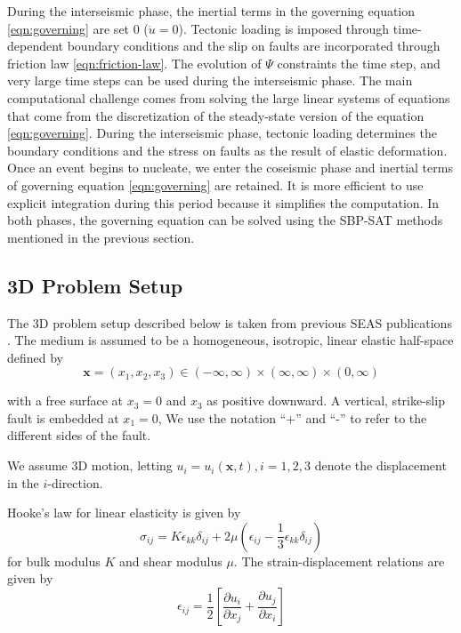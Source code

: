 During the interseismic phase, the inertial terms in the governing equation \ref{eqn:governing} are set 0 ($\ddot{u} = 0$).
Tectonic loading is imposed through time-dependent boundary conditions and the slip on faults are incorporated through friction law \ref{eqn:friction-law}.
The evolution of $\Psi$ constraints the time step, and very large time steps can be used during the interseismic phase.
The main computational challenge comes from solving the large linear systems of equations that come from the discretization of the steady-state version of the equation \ref{eqn:governing}.
During the interseismic phase, tectonic loading determines the boundary conditions and the stress on faults as the result of elastic deformation.
Once an event begins to nucleate, we enter the coseismic phase and inertial terms of governing equation \ref{eqn:governing} are retained.
It is more efficient to use explicit integration during this period because it simplifies the computation. In both phases, the governing equation can be solved using the SBP-SAT methods mentioned in the previous section.

\subsection{3D Problem Setup}
The 3D problem setup described below is taken from previous SEAS publications \cite{10.1785/0220190248}.
The medium is assumed to be a homogeneous, isotropic, linear elastic half-space defined by
\begin{equation} \label{eqn:domain}
    \textbf{x} = (x_1, x_2, x_3) \in (-\infty, \infty) \times (\infty, \infty) \times (0, \infty)
\end{equation}

with a free surface at $x_3 = 0$ and $x_3$ as positive downward. A vertical, strike-slip fault is embedded at $x_1 = 0$, We use the notation ``+'' and ``-'' to refer to the different sides of the fault. 

We assume 3D motion, letting $u_i = u_i(\textbf{x}, t), i = 1, 2, 3$ denote the displacement in the $i$-direction.

Hooke’s law for linear elasticity is given by
\begin{equation}
    \sigma_{ij} = K\epsilon_{kk}\delta_{ij} + 2\mu (\epsilon_{ij} - \frac{1}{3} \epsilon_{kk}\delta_{ij})
\end{equation}
for bulk modulus $K$ and shear modulus $\mu$. The strain-displacement relations are given by 
\begin{equation}
    \epsilon_{ij} = \frac{1}{2} \left[\frac{\partial u_i}{\partial x_j} + \frac{\partial u_j}{\partial x_i}\right]
\end{equation}

